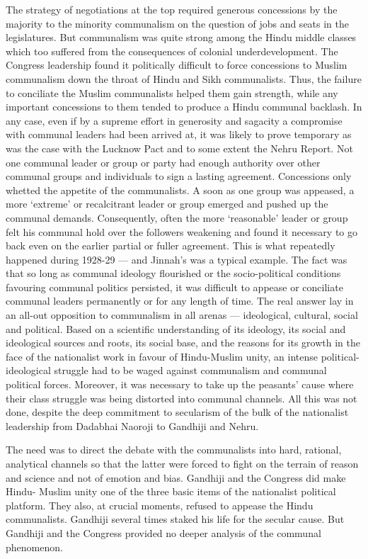 The strategy of negotiations at the top required generous concessions by the majority to the minority communalism on the question of jobs and seats in the legislatures. But communalism was quite strong among the Hindu middle classes which too suffered from the consequences of colonial underdevelopment. The Congress leadership found it politically difficult to force concessions to Muslim communalism down the throat of Hindu and Sikh communalists. Thus, the failure to conciliate the Muslim communalists helped them gain strength, while any important concessions to them tended to produce a Hindu communal backlash. In any case, even if by a supreme effort in generosity and sagacity a compromise with communal leaders had been arrived at, it was likely to prove temporary as was the case with the Lucknow Pact and to some extent the Nehru Report. Not one communal leader or group or party had enough authority over other communal groups and individuals to sign a lasting agreement. Concessions only whetted the appetite of the communalists. A soon as one group was appeased, a more ‘extreme’ or recalcitrant leader or group emerged and pushed up the communal demands. Consequently, often the more ‘reasonable’ leader or group felt his communal hold over the followers weakening and found it necessary to go back even on the earlier partial or fuller agreement. This is what repeatedly happened during 1928-29 — and Jinnah’s was a typical example. The fact was that so long as communal ideology flourished or the socio-political conditions favouring communal politics persisted, it was difficult to appease or conciliate communal leaders permanently or for any length of time. The real answer lay in an all-out opposition to communalism in all arenas — ideological, cultural, social and political. Based on a scientific understanding of its ideology, its social and ideological sources and roots, its social base, and the reasons for its growth in the face of the nationalist work in favour of Hindu-Muslim unity, an intense political-ideological struggle had to be waged against communalism and communal political forces. Moreover, it was necessary to take up the peasants’ cause where their class struggle was being distorted into communal channels. All this was not done, despite the deep commitment to secularism of the bulk of the nationalist leadership from Dadabhai Naoroji to Gandhiji and Nehru. 

The need was to direct the debate with the communalists into hard, rational, analytical channels so that the latter were forced to fight on the terrain of reason and science and not of emotion and bias. Gandhiji and the Congress did make Hindu- Muslim unity one of the three basic items of the nationalist political platform. They also, at crucial moments, refused to appease the Hindu communalists. Gandhiji several times staked his life for the secular cause. But Gandhiji and the Congress provided no deeper analysis of the communal phenomenon. 

